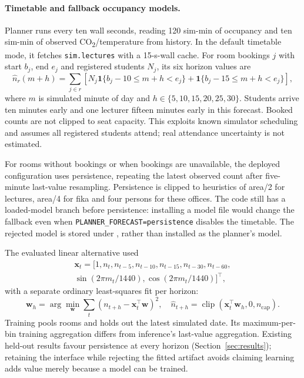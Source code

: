 \documentclass[11pt,a4paper]{article}
\begin{document}
\paragraph{Timetable and fallback occupancy models.}
Planner runs every ten wall seconds, reading 120 sim-min of occupancy and ten sim-min of observed CO\textsubscript{2}/temperature from history. In the default timetable mode, it fetches \texttt{sim.lectures} with a 15-s-wall cache. For room bookings $j$ with start $b_j$, end $e_j$ and registered students $N_j$, its six horizon values are
\begin{equation}
\widehat n_r(m+h)=\sum_{j\in r}\left[
N_j\mathbf1\{b_j-10\leq m+h<e_j\}
+\mathbf1\{b_j-15\leq m+h<e_j\}\right],
\end{equation}
where $m$ is simulated minute of day and $h\in\{5,10,15,20,25,30\}$. Students arrive ten minutes early and one lecturer fifteen minutes early in this forecast. Booked counts are not clipped to seat capacity. This exploits known simulator scheduling and assumes all registered students attend; real attendance uncertainty is not estimated.

For rooms without bookings or when bookings are unavailable, the deployed configuration uses persistence, repeating the latest observed count after five-minute last-value resampling. Persistence is clipped to heuristics of area/2 for lectures, area/4 for fika and four persons for these offices. The code still has a loaded-model branch before persistence: installing a model file would change the fallback even when \texttt{PLANNER\_FORECAST=persistence} disables the timetable. The rejected model is stored under , rather than installed as the planner's model.

The evaluated linear alternative used
\begin{equation}
\begin{split}
\mathbf x_t=[1,n_t,n_{t-5},n_{t-10},n_{t-15},n_{t-30},n_{t-60},\\
\sin(2\pi m_t/1440),\cos(2\pi m_t/1440)]^\top,
\end{split}
\end{equation}
with a separate ordinary least-squares fit per horizon:
\begin{equation}
\mathbf w_h=\arg\min_{\mathbf w}\sum_t(n_{t+h}-\mathbf x_t^\top\mathbf w)^2,
\quad \widehat n_{t+h}=\operatorname{clip}(\mathbf x_t^\top\mathbf w_h,0,n_{\mathrm{cap}}).
\end{equation}
Training pools rooms and holds out the latest simulated date. Its maximum-per-bin training aggregation differs from inference's last-value aggregation. Existing held-out results favour persistence at every horizon (Section~\ref{sec:results}); retaining the interface while rejecting the fitted artifact avoids claiming learning adds value merely because a model can be trained.
\end{document}
